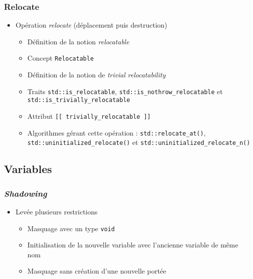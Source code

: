 \documentclass[C++.tex]{subfiles}
\begin{document}
\begin{frame}[fragile]
	\frametitle{Relocate}
	\begin{itemize}
		\item Opération \textit{relocate} (déplacement puis destruction)


		\begin{itemize}
			\item Définition de la notion \textit{relocatable}
			\item Concept \lstinline|Relocatable|


			\item Définition de la notion de \textit{trivial relocatability}


			\item Traits \lstinline|std::is_relocatable|, \lstinline|std::is_nothrow_relocatable| et \lstinline|std::is_trivially_relocatable|
			\item Attribut \lstinline|[[ trivially_relocatable ]]|
			\item Algorithmes gérant cette opération : \lstinline|std::relocate_at()|, \lstinline|std::uninitialized_relocate()| et \lstinline|std::uninitialized_relocate_n()|
		\end{itemize}
	\end{itemize}
\end{frame}

\subsection*{Variables}
\begin{frame}[fragile]
	\frametitle{\textit{Shadowing}}
	\begin{itemize}
		\item Levée plusieurs restrictions
		\begin{itemize}
			\item Masquage avec un type \lstinline|void|
			
			
			\item Initialisation de la nouvelle variable avec l'ancienne variable de même nom
			\item Masquage sans création d'une nouvelle portée
		\end{itemize}
	\end{itemize}
\end{frame}
\end{document}
